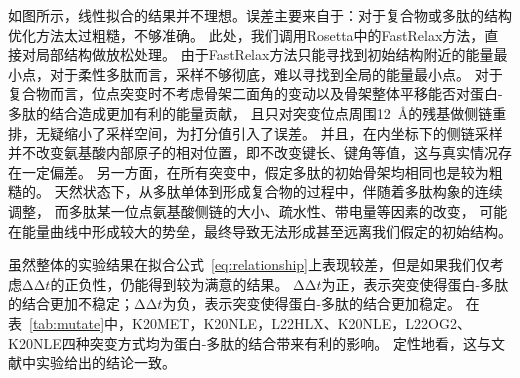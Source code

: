 如图所示，线性拟合的结果并不理想。误差主要来自于：对于复合物或多肽的结构优化方法太过粗糙，不够准确。
此处，我们调用Rosetta中的FastRelax方法\cite{RN107,RN108}，直接对局部结构做放松处理。
由于FastRelax方法只能寻找到初始结构附近的能量最小点，对于柔性多肽而言，采样不够彻底，难以寻找到全局的能量最小点。
对于复合物而言，位点突变时不考虑骨架二面角的变动以及骨架整体平移能否对蛋白-多肽的结合造成更加有利的能量贡献，
且只对突变位点周围\SI{12}{Å}的残基做侧链重排，无疑缩小了采样空间，为打分值引入了误差。
并且，在内坐标下的侧链采样并不改变氨基酸内部原子的相对位置，即不改变键长、键角等值，这与真实情况存在一定偏差。
另一方面，在所有突变中，假定多肽的初始骨架均相同也是较为粗糙的。
天然状态下，从多肽单体到形成复合物的过程中，伴随着多肽构象的连续调整，
而多肽某一位点氨基酸侧链的大小、疏水性、带电量等因素的改变，
可能在能量曲线中形成较大的势垒，最终导致无法形成甚至远离我们假定的初始结构。

虽然整体的实验结果在拟合公式~\eqref{eq:relationship}上表现较差，但是如果我们仅考虑$\increment\increment t$的正负性，仍能得到较为满意的结果。
$\increment\increment t$为正，表示突变使得蛋白-多肽的结合更加不稳定；$\increment\increment t$为负，表示突变使得蛋白-多肽的结合更加稳定。
在表~\ref{tab:mutate}中，K20MET，K20NLE，L22HLX、K20NLE，L22OG2、K20NLE四种突变方式均为蛋白-多肽的结合带来有利的影响。
定性地看，这与文献中实验给出的结论一致。